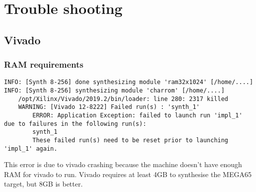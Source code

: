 \chapter{Trouble shooting}
    \section{Vivado}
    \subsection{RAM requirements}
    \begin{tcolorbox}[colback=black,coltext=white]
    \verbatimfont{\codefont}
    \begin{verbatim}
INFO: [Synth 8-256] done synthesizing module 'ram32x1024' [/home/....]
INFO: [Synth 8-256] synthesizing module 'charrom' [/home/....]
    /opt/Xilinx/Vivado/2019.2/bin/loader: line 280: 2317 killed
    WARNING: [Vivado 12-8222] Failed run(s) : 'synth_1'
        ERROR: Application Exception: failed to launch run 'impl_1' due to failures in the following run(s):
        synth_1
        These failed run(s) need to be reset prior to launching 'impl_1' again.
    \end{verbatim}
    \end{tcolorbox}
This error is due to vivado crashing because the machine doesn't have enough RAM for vivado to run.
Vivado requires at least 4GB to synthesise the MEGA65 target, but 8GB is better.


